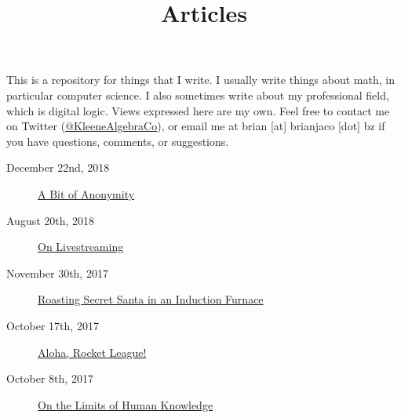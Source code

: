 \documentclass{article}
\title{Articles}
\date{}
\begin{document}
\maketitle

This is a repository for things that I write. I usually write things about math, in particular computer science. I also sometimes write about my professional field, which is digital logic. Views expressed here are my own. Feel free to contact me on Twitter (\href{https://twitter.com/KleeneAlgebraCo}{@KleeneAlgebraCo}), or email me at brian [at] brianjaco [dot] bz if you have questions, comments, or suggestions.

\begin{description}
\item[December 22nd, 2018] \href{a-bit-anonymous/index.html}{A Bit of Anonymity}
\item[August 20th, 2018] \href{on-livestreaming/index.html}{On Livestreaming}
\item[November 30th, 2017] \href{secret-santa/index.html}{Roasting Secret Santa in an Induction Furnace}
\item[October 17th, 2017] \href{aloha-rocket-league/index.html}{Aloha, Rocket League!}
\item[October 8th, 2017] \href{limits-of-human-knowledge/index.html}{On the Limits of Human Knowledge}
\end{description}
\end{document}
